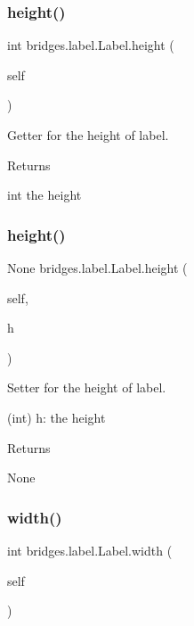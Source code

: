 \subsubsection{\texorpdfstring{height()}{height()}\hspace{0.1cm}{\footnotesize\ttfamily [1/2]}}
{\footnotesize\ttfamily  int bridges.\+label.\+Label.\+height (\begin{DoxyParamCaption}\item[{}]{self }\end{DoxyParamCaption})}



Getter for the height of label. 

\begin{DoxyReturn}{Returns}


int the height 
\end{DoxyReturn}
\mbox{\label{classbridges_1_1label_1_1_label_aff85fe5d53c73ba12851145f4771c02f}} 
\subsubsection{\texorpdfstring{height()}{height()}\hspace{0.1cm}{\footnotesize\ttfamily [2/2]}}
{\footnotesize\ttfamily  None bridges.\+label.\+Label.\+height (\begin{DoxyParamCaption}\item[{}]{self,  }\item[{int}]{h }\end{DoxyParamCaption})}



Setter for the height of label. 

\begin{DoxyVerb}       (int) h: the height
\end{DoxyVerb}
 \begin{DoxyReturn}{Returns}


None 
\end{DoxyReturn}
\mbox{\label{classbridges_1_1label_1_1_label_a69c94eba378b7c10745463354982e54d}} 
\subsubsection{\texorpdfstring{width()}{width()}\hspace{0.1cm}{\footnotesize\ttfamily [1/2]}}
{\footnotesize\ttfamily  int bridges.\+label.\+Label.\+width (\begin{DoxyParamCaption}\item[{}]{self }\end{DoxyParamCaption})}



